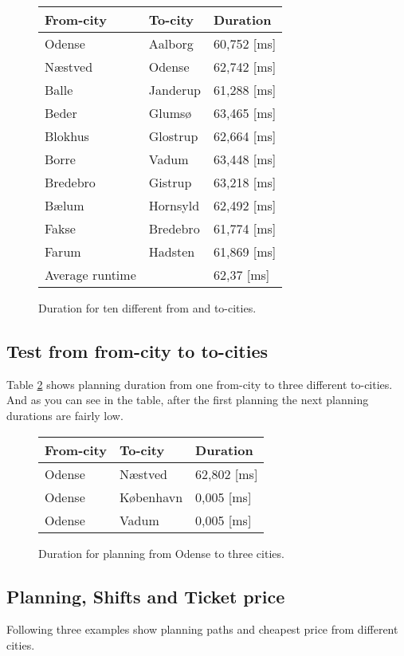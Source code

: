 \begin{figure}[th!]
\centering
\begin{tabular}{l|l|l}
From-city & To-city & Duration \\\hline
Odense & Aalborg & 60,752 [ms] \\
Næstved & Odense & 62,742 [ms] \\
Balle & Janderup & 61,288 [ms] \\
Beder & Glumsø & 63,465 [ms] \\
Blokhus & Glostrup & 62,664 [ms] \\
Borre & Vadum & 63,448 [ms] \\
Bredebro & Gistrup & 63,218 [ms] \\
Bælum & Hornsyld & 62,492 [ms] \\
Fakse & Bredebro & 61,774 [ms] \\
Farum & Hadsten & 61,869 [ms] \\\hline
Average runtime && 62,37 [ms]
\end{tabular}
\captionsetup{type=table}
\caption[tekst i indholdsfortegnelsen]{Duration for ten different from and to-cities.}
\label{tb:fromtoten}
\end{figure}



\subsection{Test from from-city to to-cities}
Table \ref{tb:fromonetocities} shows planning duration from one from-city to three different to-cities. And as you can see in the table, after the first planning the next planning durations are fairly low.
\begin{figure}[th!]
\centering
\begin{tabular}{l|l|l}
From-city & To-city & Duration \\\hline
Odense & Næstved & 62,802 [ms] \\
Odense & København & 0,005 [ms] \\
Odense & Vadum & 0,005 [ms]  
\end{tabular}
\captionsetup{type=table}
\caption[tekst i indholdsfortegnelsen]{Duration for planning from Odense to three cities.}
\label{tb:fromonetocities}
\end{figure}


\subsection{Planning, Shifts and Ticket price}
Following three examples show planning paths and cheapest price from different cities.

